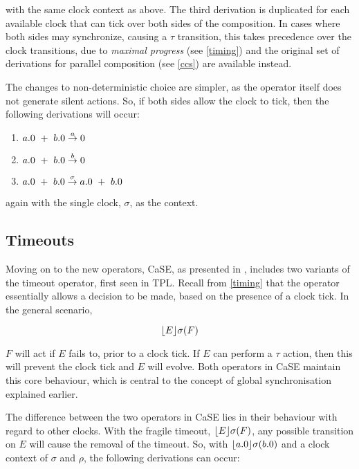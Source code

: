 \noindent with the same clock context as above.  The third derivation
is duplicated for each available clock that can tick over both sides
of the composition.  In cases where both sides may synchronize,
causing a $\tau$ transition, this takes precedence over the clock
transitions, due to \emph{maximal progress} (see \ref{timing}) and the
original set of derivations for parallel composition (see \ref{ccs})
are available instead.

The changes to non-deterministic choice are simpler, as the operator itself
does not generate silent actions.  So, if both sides allow the clock to tick,
then the following derivations will occur:

\begin{enumerate}
\item $a.0\ +\ b.0 \stackrel{a}{\rightarrow} 0$
\item $a.0\ +\ b.0 \stackrel{b}{\rightarrow} 0$
\item $a.0\ +\ b.0 \derives{\sigma} a.0\ +\ b.0$
\end{enumerate}

\noindent again with the single clock, $\sigma$, as the context.

\subsection{Timeouts}

Moving on to the new operators, CaSE, as presented in
\cite{norton05alg}, includes two variants of the timeout operator,
first seen in TPL.  Recall from \ref{timing} that the operator
essentially allows a decision to be made, based on the presence of a
clock tick.  In the general scenario,

\begin{equation}
\lfloor{E}\rfloor {\sigma} ({F})
\end{equation}

\noindent $F$ will act if $E$ fails to, prior to a clock tick.  If $E$
can perform a $\tau$ action, then this will prevent the clock tick and
$E$ will evolve. Both operators in CaSE maintain this core behaviour,
which is central to the concept of global synchronisation explained
earlier.

The difference between the two operators in CaSE lies in their
behaviour with regard to other clocks.  With the fragile timeout,
$\lfloor{E}\rfloor {\sigma} ({F})$, any possible transition on $E$ will cause the
removal of the timeout.  So, with $\lfloor{a.0}\rfloor {\sigma} ({b.0})$ and a clock
context of $\sigma$ and $\rho$, the following derivations can occur:

